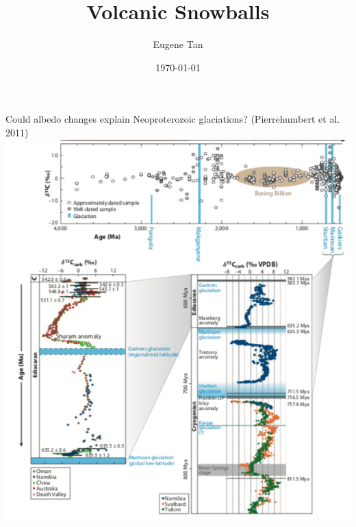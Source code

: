 \documentclass[11pt,handout]{beamer}
\begin{document}

\title[Volcanic Snowball Earth]{Volcanic Snowballs}
\author{Eugene Tan}
\date{\today}


\begin{frame}{Could albedo changes explain Neoproterozoic glaciations? (Pierrehumbert et al. 2011)}
    \centering
    \includegraphics[width=.8\textwidth,height=.85\textheight,keepaspectratio]{img/pierrehumbert.png}
\end{frame}
\end{document}

